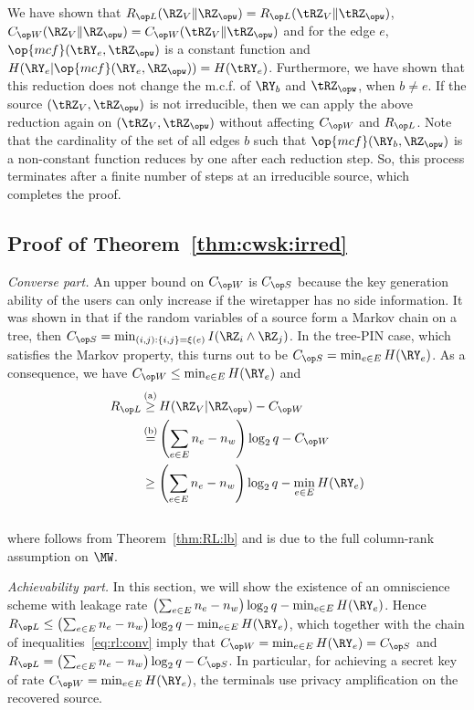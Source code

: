 We have shown that $\rl(\RZ_V\|\RZ_{\opw}) = \rl(\tRZ_V\|\tRZ_{\opw})$,  $\wskc(\RZ_V\| \RZ_{\opw}) = \wskc(\tRZ_V\|\tRZ_{\opw})$  and  for the edge $e$, $\op{mcf}(\tRY_e, \tRZ_{\opw})$ is a constant function and $H(\RY_e|\op{mcf}(\RY_e, \RZ_{\opw}))= H(\tRY_e)$. Furthermore, we have shown that this  reduction does not change the m.c.f. of  $\RY_b$  and  $\tRZ_{\opw}$, when $b \neq e$. If the source $(\tRZ_V, \tRZ_{\opw})$ is not irreducible, then we can apply the above reduction again on $(\tRZ_V, \tRZ_{\opw})$ without affecting $\wskc$ and $\rl$. Note that the cardinality of the set of all edges $b$ such that $\op{mcf}(\RY_b, \RZ_{\opw})$ is a non-constant function reduces by one after each reduction step. So, this process terminates after a finite number of steps at an irreducible source, which completes the proof.

\subsection{Proof of Theorem~\ref{thm:cwsk:irred}}\label{thm:proof:cwsk:irred}
\emph{Converse part.} An  upper bound on  $\wskc$  is $\skc$ because the key generation ability of the users can only increase if the wiretapper has no side information. It was shown in \cite[Example 5]{csiszar04} that if the random variables of a source form a Markov chain on a tree, then $\skc = \min_{(i,j) : \{i,j\} = \xi(e) } I(\RZ_i \wedge \RZ_j)$. In the tree-PIN case, which satisfies the Markov property, this turns out to be $\skc=\min_{e \in E} H(\RY_e)$. As a consequence, we have $\wskc \leq \min_{e \in E} H(\RY_e)$ and 
\begin{align}\label{eq:rl:conv}
\begin{split}
 \rl&\utag{a}\geq H(\RZ_V|\RZ_{\opw}) -\wskc \\ 
 &\utag{b}= \left(\sum_{e \in E}n_e -n_w\right)\log_2q -\wskc \\
 &\geq \left(\sum_{e \in E}n_e -n_w\right)\log_2q  - \min_{e \in E} H(\RY_e)
 \end{split}
\end{align}\\
where  follows from Theorem~\ref{thm:RL:lb} and  is due to the full column-rank assumption on $\MW$.

\emph{Achievability part.}  In this section, we will show the existence of an omniscience scheme with leakage rate $\left(\sum_{e \in E}n_e -n_w\right)\log_2q  - \min_{e \in E} H(\RY_e)$. Hence $\rl \leq \left(\sum_{e \in E}n_e -n_w\right)\log_2q  - \min_{e \in E} H(\RY_e)$,  which together with the chain of inequalities~\eqref{eq:rl:conv} imply that $\wskc = \min_{e \in E} H(\RY_e)=\skc$  and $\rl =\left(\sum_{e \in E}n_e -n_w\right)\log_2q- \skc$. In particular, for achieving a secret key of rate $\wskc = \min_{e \in E} H(\RY_e)$, the terminals use privacy amplification on the recovered source.

